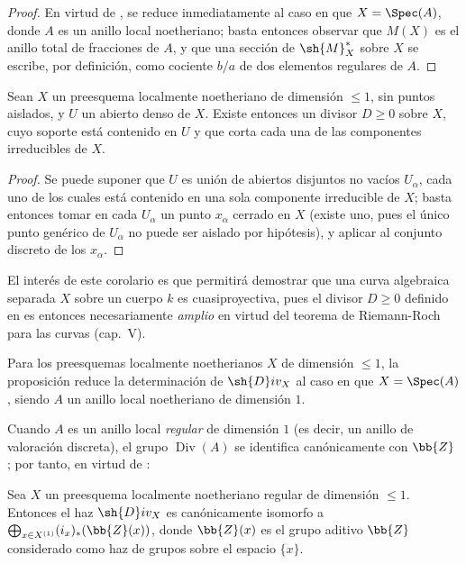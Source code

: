 \begin{proof}
En virtud de , se reduce inmediatamente al caso en que $X=\Spec(A)$, donde $A$ es un anillo local noetheriano;
basta entonces observar que $M(X)$ es el anillo total de fracciones de $A$, y que una sección de $\sh{M}^*_X$ sobre $X$ se escribe, por definición, como cociente $b/a$ de dos elementos regulares de $A$.
\end{proof}

\begin{corollary}[21.9.7]
\label{IV.21.9.7}
Sean $X$ un preesquema localmente noetheriano de dimensión $\leq1$, sin puntos aislados, y $U$ un abierto denso de $X$.
Existe entonces un divisor $D\geq0$ sobre $X$, cuyo soporte está contenido en $U$ y que corta cada una de las componentes irreducibles de $X$.
\end{corollary}

\begin{proof}
Se puede suponer que $U$ es unión de abiertos disjuntos no vacíos $U_\alpha$, cada uno de los cuales está contenido en una sola componente irreducible de $X$;
basta entonces tomar en cada $U_\alpha$ un punto $x_\alpha$ cerrado en $X$ (existe uno, pues el único punto genérico de $U_\alpha$ no puede ser aislado por hipótesis), y aplicar  al conjunto discreto de los $x_\alpha$.
\end{proof}

El interés de este corolario es que permitirá demostrar que una curva algebraica separada $X$ sobre un cuerpo $k$ es cuasiproyectiva, pues el divisor $D\geq0$ definido en  es entonces necesariamente \emph{amplio} en virtud del teorema de Riemann-Roch para las curvas (cap.~V).

\begin{env}[21.9.8]
\label{IV.21.9.8}
Para los preesquemas localmente noetherianos $X$ de dimensión $\leq1$, la proposición  reduce la determinación de $\sh{D}iv_X$ al caso en que $X=\Spec(A)$, siendo $A$ un anillo local noetheriano de dimensión $1$.

Cuando $A$ es un anillo local \emph{regular} de dimensión $1$ (es decir, un anillo de valoración discreta), el grupo $\operatorname{Div}(A)$ se identifica canónicamente con $\bb{Z}$ ;
por tanto, en virtud de :
\end{env}

\begin{proposition}[21.9.9]
\label{IV.21.9.9}
Sea $X$ un preesquema localmente noetheriano \textup{regular} de dimensión $\leq1$.
Entonces el haz $\sh{D}iv_X$ es canónicamente isomorfo a $\bigoplus_{x\in X^{(1)}}(i_x)_*(\bb{Z}(x))$, donde $\bb{Z}(x)$ es el grupo aditivo $\bb{Z}$ considerado como haz de grupos sobre el espacio $\{x\}$.
\end{proposition}

